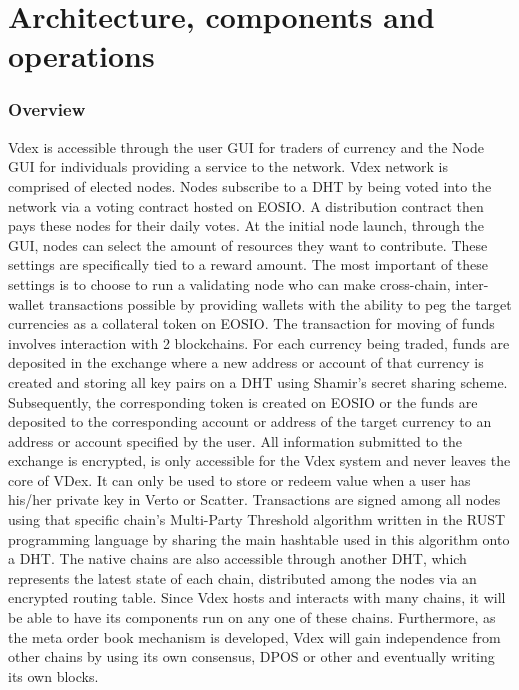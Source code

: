 \documentclass[]{article}
\begin{document}
{									
\section{Architecture, components and operations}
	
	\subsubsection{Overview}
	Vdex is accessible through the user GUI for traders of currency and the Node GUI for individuals providing a service to the network.     Vdex network is comprised of elected nodes.
	Nodes subscribe to a DHT 
	by being voted into the network via a voting contract hosted on EOSIO. 
	A distribution contract then pays these nodes for their daily votes.
	At the initial node launch, through the GUI, nodes can select the amount of resources they want to contribute.
	These settings are specifically tied to a reward amount.
	The most important of these settings is to choose to run a validating node who can make cross-chain, inter-wallet transactions possible by providing wallets with the ability to peg the target currencies as a collateral token on EOSIO. 
	The transaction for moving of funds involves interaction with 2 blockchains. 
	For each currency being traded, funds are deposited in the exchange where a new address or account of that currency is created and storing all key pairs on a DHT using Shamir's secret sharing scheme. \cite{29}Subsequently, the corresponding token is created on EOSIO or the funds are deposited to the corresponding account or address of the target currency to an address or account specified by the user.
	All information submitted to the exchange is encrypted, is only accessible for the Vdex system  and never leaves the core of VDex. It can only be used to store or redeem value when a user has his/her private key in Verto or Scatter.
	Transactions are signed among all nodes using that specific chain's Multi-Party Threshold algorithm  \cite{26}  written in the RUST  programming language by sharing the main hashtable used in this algorithm onto a DHT. 
	The native chains are also accessible through another DHT, which represents the latest state of each chain, distributed among the nodes via an encrypted routing table.\cite{27} \cite{28}
	Since Vdex hosts and interacts with many chains, it will be able to have its components run on any one of these chains. Furthermore, as the meta order book mechanism is developed, Vdex will gain independence from other chains by using its own consensus, DPOS or other and eventually writing its own blocks.
	 
}
\end{document}

